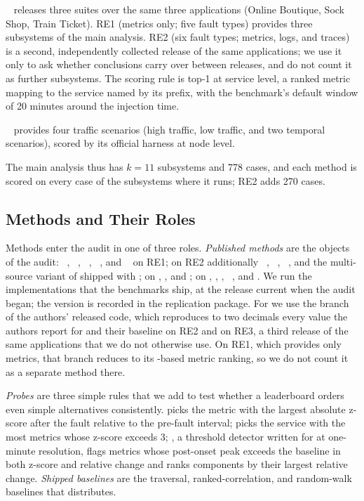 \textbf{\rcaeval}~\citep{pham2024rcaeval} releases three suites over the same three applications (Online Boutique, Sock Shop, Train Ticket).
RE1 (metrics only; five fault types) provides three subsystems of the main analysis.
RE2 (six fault types; metrics, logs, and traces) is a second, independently collected release of the same applications; we use it only to ask whether conclusions carry over between releases, and do not count it as further subsystems.
The scoring rule is top-1 at service level, a ranked metric mapping to the service named by its prefix, with the benchmark's default window of 20 minutes around the injection time.

\textbf{\petshop}~\citep{hardt2024petshop} provides four traffic scenarios (high traffic, low traffic, and two temporal scenarios), scored by its official harness at node level.

The main analysis thus has $k=11$ subsystems and 778 cases, and each method is scored on every case of the subsystems where it runs; RE2 adds 270 cases.


\subsection{Methods and Their Roles}
\label{sec:design-methods}

Methods enter the audit in one of three roles.
\emph{Published methods} are the objects of the audit: \baro~\citep{pham2024baro}, \circa~\citep{li2022circa}, \ediag~\citep{ediagnosis}, \rcd~\citep{ikram2022rcd}, and \causalrca~\citep{causalrca} on RE1; on RE2 additionally \simplerca~\citep{fang2025simplerca}, \tracerca~\citep{li2021tracerca}, \microrank~\citep{yu2021microrank}, and the multi-source variant of \baro shipped with \rcaeval; on \openrca \baro, \ediag, and \rcd; on \petshop \circa, \rcd, \ediag, \cfa~\citep{budhathoki2022causal}, and \baro.
We run the implementations that the benchmarks ship, at the release current when the audit began; the version is recorded in the replication package.
For \simplerca we use the \rcaeval branch of the authors' released code, which reproduces to two decimals every value the authors report for \simplerca and their \baro baseline on RE2 and on RE3, a third release of the same applications that we do not otherwise use.
On RE1, which provides only metrics, that branch reduces to its \baro-based metric ranking, so we do not count it as a separate method there.

\emph{Probes} are three simple rules that we add to test whether a leaderboard orders even simple alternatives consistently.
\maxz picks the metric with the largest absolute z-score after the fault relative to the pre-fault interval; \alertcount picks the service with the most metrics whose z-score exceeds 3; \cdmin, a threshold detector written for \openrca at one-minute resolution, flags metrics whose post-onset peak exceeds the baseline in both z-score and relative change and ranks components by their largest relative change.
\emph{Shipped baselines} are the traversal, ranked-correlation, and random-walk baselines that \petshop distributes.

